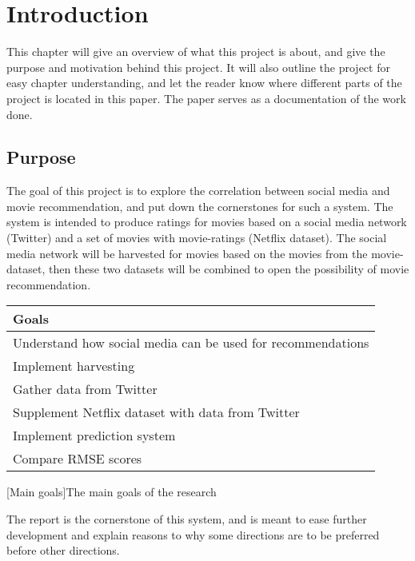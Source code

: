 
\chapter{Introduction}

\minitoc
\setcounter{page}{1}

This chapter will give an overview of what this project is about, and give the purpose and motivation behind this project. It will also outline the project for easy chapter understanding, and let the reader know where different parts of the project is located in this paper. The paper serves as a documentation of the work done.

\clearpage


\section{Purpose}
The goal of this project is to explore the correlation between social media and movie recommendation, and put down the cornerstones for such a system. The system is intended to produce ratings for movies based on a social media network (Twitter) and a set of movies with movie-ratings (Netflix dataset). The social media network will be harvested for movies based on the movies from the movie-dataset, then these two datasets will be combined to open the possibility of movie recommendation.

\begin{table}[H]
    \centering
    \begin{tabular}{ l }
        \textbf{Goals} \\ \hline
        Understand how social media can be used for recommendations \\
        Implement harvesting \\
        Gather data from Twitter \\
        Supplement Netflix dataset with data from Twitter \\
        Implement prediction system \\
        Compare RMSE scores \\
    \end{tabular}
    [Main goals]{The main goals of the research}
    \label{tab:main-goals}
\end{table}

The report is the cornerstone of this system, and is meant to ease further development and explain reasons to why some directions are to be preferred before other directions.


